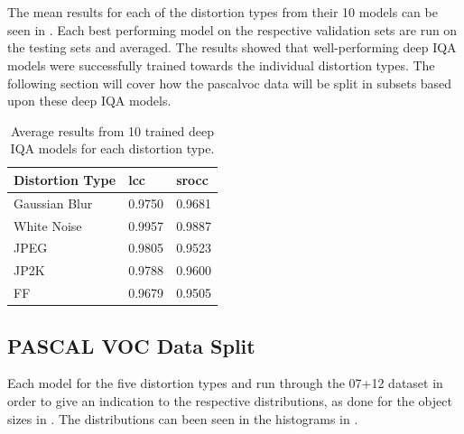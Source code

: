 \\\\
The mean results for each of the distortion types from their 10 models can be seen in . Each best performing model on the respective validation sets are run on the testing sets and averaged. The results showed that well-performing deep IQA models were successfully trained towards the individual distortion types. The following section will cover how the \gls{pascalvoc} data will be split in subsets based upon these deep IQA models.

\begin{table}[h]
\centering
\caption{Average results from 10 trained deep IQA models for each distortion type.}
\label{tab:iqaavg}
\begin{tabular}{|l|l|l|}
\hline
\textbf{Distortion Type} & \textbf{\gls{lcc}}    & \textbf{\gls{srocc}}  \\ \hline
Gaussian Blur   & 0.9750 & 0.9681 \\ \hline
White Noise     & 0.9957 & 0.9887 \\ \hline
JPEG            & 0.9805 & 0.9523 \\ \hline
JP2K            & 0.9788 & 0.9600 \\ \hline
FF     & 0.9679 & 0.9505 \\ \hline
\end{tabular}
\end{table}


\subsection{PASCAL VOC Data Split}
Each model for the five distortion types and run through the 07+12 dataset in order to give an indication to the respective distributions, as done for the object sizes in . The distributions can been seen in the histograms in .

